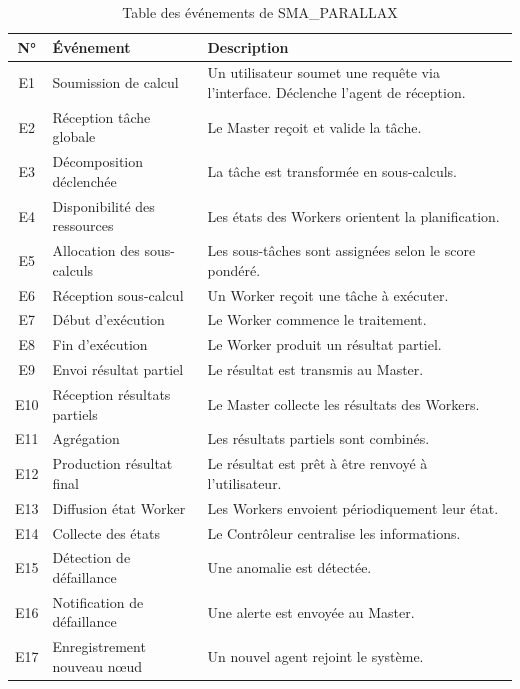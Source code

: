 \documentclass[12pt,a4paper]{report}
\begin{document}
\begin{table}[H]
\centering
\renewcommand{\arraystretch}{1.3}
\begin{tabular}{|c|p{4cm}|p{9cm}|}
\hline
\textbf{N°} & \textbf{Événement} & \textbf{Description} \\
\hline
E1 & Soumission de calcul & Un utilisateur soumet une requête via l'interface. Déclenche l'agent de réception. \\
\hline
E2 & Réception tâche globale & Le Master reçoit et valide la tâche. \\
\hline
E3 & Décomposition déclenchée & La tâche est transformée en sous-calculs. \\
\hline
E4 & Disponibilité des ressources & Les états des Workers orientent la planification. \\
\hline
E5 & Allocation des sous-calculs & Les sous-tâches sont assignées selon le score pondéré. \\
\hline
E6 & Réception sous-calcul & Un Worker reçoit une tâche à exécuter. \\
\hline
E7 & Début d'exécution & Le Worker commence le traitement. \\
\hline
E8 & Fin d'exécution & Le Worker produit un résultat partiel. \\
\hline
E9 & Envoi résultat partiel & Le résultat est transmis au Master. \\
\hline
E10 & Réception résultats partiels & Le Master collecte les résultats des Workers. \\
\hline
E11 & Agrégation & Les résultats partiels sont combinés. \\
\hline
E12 & Production résultat final & Le résultat est prêt à être renvoyé à l'utilisateur. \\
\hline
E13 & Diffusion état Worker & Les Workers envoient périodiquement leur état. \\
\hline
E14 & Collecte des états & Le Contrôleur centralise les informations. \\
\hline
E15 & Détection de défaillance & Une anomalie est détectée. \\
\hline
E16 & Notification de défaillance & Une alerte est envoyée au Master. \\
\hline
E17 & Enregistrement nouveau nœud & Un nouvel agent rejoint le système. \\
\hline
\end{tabular}
\caption{Table des événements de SMA\_PARALLAX}
\label{tab:events}
\end{table}
\end{document}

